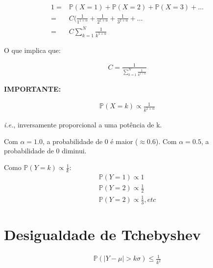 \documentclass[11pt,a4paper]{article}
\begin{document}
		\begin{eqnarray*}
			1=&\mathbb{P}(X=1)+\mathbb{P}(X=2)+\mathbb{P}(X=3)+\ldots\\
			=&C(\frac{1}{1^{1+\alpha}}+\frac{1}{2^{1+\alpha}}+\frac{1}{3^{1+\alpha}}+\ldots\\
			=&C\sum_{k=1}^N\frac{1}{k^{1+\alpha}}
		\end{eqnarray*}
		
		O que implica que:
		
		\begin{eqnarray*}
			C=\frac{1}{\sum_{k=1}^N\frac{1}{k^{1+\alpha}}}
		\end{eqnarray*}
		
		\textbf{IMPORTANTE:} 
		
		\begin{eqnarray*}
			\mathbb{P}(X=k)\propto\frac{1}{k^{1+\alpha}}
		\end{eqnarray*}
		
		\textit{i.e.}, inversamente proporcional a uma potência de k.
		
		Com $\alpha=1.0$, a probabilidade de 0 é maior ($\approx 0.6$).
		Com $\alpha=0.5$, a probabilidade de 0 diminui.
		
		Como $\mathbb{P}(Y=k)\propto\frac{1}{k}$:
		\begin{eqnarray*}
			\mathbb{P}(Y=1)\propto 1\\
			\mathbb{P}(Y=2)\propto\frac{1}{2}\\
			\mathbb{P}(Y=2)\propto\frac{1}{3}, etc
		\end{eqnarray*}
		
		\section{Desigualdade de Tchebyshev}
		
		\begin{eqnarray*}
			\mathbb{P}(|Y-\mu|>k\sigma)\leq \frac{1}{k^2}
		\end{eqnarray*}
\end{document}

